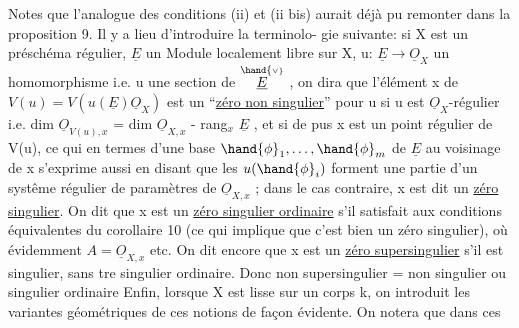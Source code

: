  Notes que l'analogue des conditions (ii) et (ii bis) aurait déjà
pu remonter dans la proposition 9. Il y a lieu d'introduire la terminolo-%
gie suivante: si X est un préschéma régulier, $\underline{E}$ un Module localement libre
 sur X, u: $\underline{E}\to\underline{O}_X$ un homomorphisme i.e. u une section de
$\overset{\hand{\scriptscriptstyle\vee}}{\underline{E}}$ , on dira que l'élément x de $V(u)=V(u(\underline{E})\underline{O}_X)$ est un 
``\uline{zéro non singulier}'' pour u\hand{,} si u est $\underline{O}_X$-régulier i.e. dim $\underline{O}_{V(u),x}$
= dim $\underline{O}_{X,x}$ - rang$_x$ $\underline{E}$ , et si de pus x est un point régulier de V(u),
ce qui en termes d'une base $\hand{\phi}_1,\ldots,\hand{\phi}_m$ de $\underline{E}$ au voisinage de x s'exprime
aussi en disant que les $u(\hand{\phi}_i)$ forment une partie d'un systême régulier
de paramètres de $\underline{O}_{X,x}$ ; dans le cas contraire, x est dit un \uline{zéro}
\uline{singulier}. On dit que x est un \uline{zéro singulier ordinaire} s'il satisfait
aux conditions équivalentes du corollaire 10 (ce qui implique que c'est
bien un zéro singulier), où évidemment $A=\underline{O}_{X,x}$ etc. On dit encore que
x est un \uline{zéro supersingulier} s'il est singulier, sans \hand{\^{\textcolor{black}{e}}}tre singulier
ordinaire. Donc non supersingulier = non singulier ou singulier ordinaire
Enfin, lorsque X est lisse sur un corps k, on introduit les variantes
géométriques de ces notions de façon évidente. On notera que dans ces

